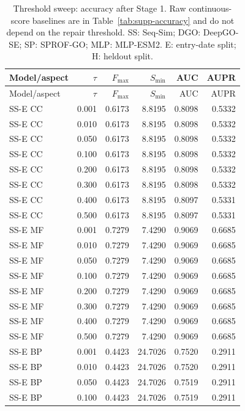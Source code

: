 \begingroup\scriptsize
\setlength{\tabcolsep}{4pt}
\begin{longtable}{lrrrrr}
\caption{Threshold sweep: accuracy after Stage 1. Raw continuous-score baselines are in Table~\ref{tab:supp-accuracy} and do not depend on the repair threshold. SS: Seq-Sim; DGO: DeepGO-SE; SP: SPROF-GO; MLP: MLP-ESM2. E: entry-date split; H: heldout split.}\label{tab:supp-threshold-metrics}\\
\toprule
Model/aspect & $\tau$ & $F_{\max}$ & $S_{\min}$ & AUC & AUPR \\
\midrule
\endfirsthead
\toprule
Model/aspect & $\tau$ & $F_{\max}$ & $S_{\min}$ & AUC & AUPR \\
\midrule
\endhead
SS-E CC & 0.001 & 0.6173 & 8.8195 & 0.8098 & 0.5332 \\
SS-E CC & 0.010 & 0.6173 & 8.8195 & 0.8098 & 0.5332 \\
SS-E CC & 0.050 & 0.6173 & 8.8195 & 0.8098 & 0.5332 \\
SS-E CC & 0.100 & 0.6173 & 8.8195 & 0.8098 & 0.5332 \\
SS-E CC & 0.200 & 0.6173 & 8.8195 & 0.8098 & 0.5332 \\
SS-E CC & 0.300 & 0.6173 & 8.8195 & 0.8098 & 0.5332 \\
SS-E CC & 0.400 & 0.6173 & 8.8195 & 0.8097 & 0.5331 \\
SS-E CC & 0.500 & 0.6173 & 8.8195 & 0.8097 & 0.5331 \\
SS-E MF & 0.001 & 0.7279 & 7.4290 & 0.9069 & 0.6685 \\
SS-E MF & 0.010 & 0.7279 & 7.4290 & 0.9069 & 0.6685 \\
SS-E MF & 0.050 & 0.7279 & 7.4290 & 0.9069 & 0.6685 \\
SS-E MF & 0.100 & 0.7279 & 7.4290 & 0.9069 & 0.6685 \\
SS-E MF & 0.200 & 0.7279 & 7.4290 & 0.9069 & 0.6685 \\
SS-E MF & 0.300 & 0.7279 & 7.4290 & 0.9069 & 0.6685 \\
SS-E MF & 0.400 & 0.7279 & 7.4290 & 0.9069 & 0.6685 \\
SS-E MF & 0.500 & 0.7279 & 7.4290 & 0.9069 & 0.6685 \\
SS-E BP & 0.001 & 0.4423 & 24.7026 & 0.7520 & 0.2911 \\
SS-E BP & 0.010 & 0.4423 & 24.7026 & 0.7520 & 0.2911 \\
SS-E BP & 0.050 & 0.4423 & 24.7026 & 0.7519 & 0.2911 \\
SS-E BP & 0.100 & 0.4423 & 24.7026 & 0.7519 & 0.2911 \\

\end{longtable}
